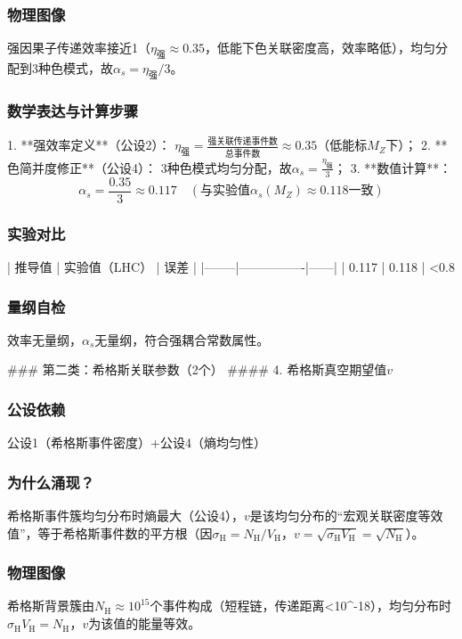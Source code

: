 \documentclass{article}
\begin{document}
\subsubsection{物理图像}
强因果子传递效率接近1（\(\eta_{\text{强}}≈0.35\)，低能下色关联密度高，效率略低），均匀分配到3种色模式，故\(\alpha_s = \eta_{\text{强}}/3\)。

\subsubsection{数学表达与计算步骤}
1. **强效率定义**（公设2）：  
   \(\eta_{\text{强}} = \frac{\text{强关联传递事件数}}{\text{总事件数}}≈0.35\)（低能标\(M_Z\)下）；  
2. **色简并度修正**（公设4）：  
   3种色模式均匀分配，故\(\alpha_s = \frac{\eta_{\text{强}}}{3}\)；  
3. **数值计算**：  
   \[
   \alpha_s = \frac{0.35}{3}≈0.117 \quad (\text{与实验值}\alpha_s(M_Z)≈0.118\text{一致})
   \]

\subsubsection{实验对比}
| 推导值 | 实验值（LHC） | 误差 |
|--------|----------------|------|
| 0.117 | 0.118 | <0.8%

\subsubsection{量纲自检}
效率无量纲，\(\alpha_s\)无量纲，符合强耦合常数属性。


### 第二类：希格斯关联参数（2个）
#### 4. 希格斯真空期望值\(v\)
\subsubsection{公设依赖}
公设1（希格斯事件密度）+公设4（熵均匀性）

\subsubsection{为什么涌现？}
希格斯事件簇均匀分布时熵最大（公设4），\(v\)是该均匀分布的“宏观关联密度等效值”，等于希格斯事件数的平方根（因\(\sigma_{\text{H}} = N_{\text{H}}/V_{\text{H}}\)，\(v = \sqrt{\sigma_{\text{H}}V_{\text{H}}} = \sqrt{N_{\text{H}}}\)）。

\subsubsection{物理图像}
希格斯背景簇由\(N_{\text{H}}≈10^{15}\)个事件构成（短程链，传递距离<10^{-18}），均匀分布时\(\sigma_{\text{H}}V_{\text{H}} = N_{\text{H}}\)，\(v\)为该值的能量等效。
\end{document}
